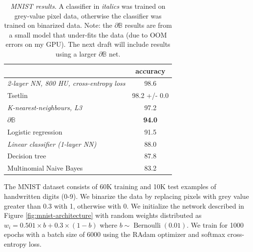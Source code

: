 \documentclass{article}
\theoremstyle{plain}
\theoremstyle{definition}
\theoremstyle{remark}
\begin{document}
\begin{table}[t]
	\centering
	\begin{tabular}{lc}
		\cline{2-2}
		& \textbf{accuracy}                  \\ \hline
		\multicolumn{1}{|l|}{\em 2-layer NN, 800 HU, cross-entropy loss} & \multicolumn{1}{c|}{98.6} \\ \hline
		\multicolumn{1}{|l|}{Tsetlin}                        & \multicolumn{1}{c|}{98.2 +/- 0.0}  \\ \hline
		\multicolumn{1}{|l|}{\em K-nearest-neighbours, L3}       & \multicolumn{1}{c|}{97.2}          \\ \hline
		\multicolumn{1}{|l|}{$\partial\mathbb{B}$}           & \multicolumn{1}{c|}{\textbf{94.0}} \\ \hline
		\multicolumn{1}{|l|}{Logistic regression}            & \multicolumn{1}{c|}{91.5}          \\ \hline
		\multicolumn{1}{|l|}{\em Linear classifier (1-layer NN)} & \multicolumn{1}{c|}{88.0}          \\ \hline
		\multicolumn{1}{|l|}{Decision tree}                  & \multicolumn{1}{c|}{87.8}          \\ \hline
		\multicolumn{1}{|l|}{Multinomial Naive Bayes}        & \multicolumn{1}{c|}{83.2}          \\ \hline
	\end{tabular}
	\caption{{\em MNIST results}. A classifier in {\em italics} was trained on grey-value pixel data, otherwise the classifier was trained on binarized data. Note: the $\partial\mathbb{B}$ results are from a small model that under-fits the data (due to OOM errors on my GPU). The next draft will include results using a larger $\partial\mathbb{B}$ net.}
	\label{tab:mnist-table}
\end{table}

The MNIST dataset \cite{726791} consists of 60K training and 10K test examples of handwritten digits (0-9). We binarize the data by replacing pixels with grey value greater than 0.3 with 1, otherwise with 0. We initialize the network described in Figure \ref{fig:mnist-architecture} with random weights distributed as $w_{i} = 0.501 \times b + 0.3 \times (1-b)$ where $b \sim \operatorname{Bernoulli}(0.01)$. We train for 1000 epochs with a batch size of 6000 using the RAdam optimizer and softmax cross-entropy loss.
\end{document}

